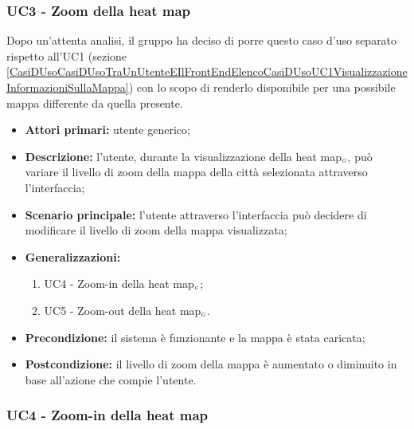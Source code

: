 \subsubsection{UC3 - Zoom della heat map}\label{CasiDUsoCasiDUsoTraUnUtenteEIlFrontEndElencoCasiDUsoUC3ZoomDellaHeatMap}

Dopo un'attenta analisi, il gruppo ha deciso di porre questo caso d'uso separato rispetto all'UC1 (sezione \ref{CasiDUsoCasiDUsoTraUnUtenteEIlFrontEndElencoCasiDUsoUC1VisualizzazioneInformazioniSullaMappa}) con lo scopo di renderlo disponibile per una possibile mappa differente da quella presente.



\begin{itemize}
	\item \textbf{Attori primari:} utente generico;
	\item \textbf{Descrizione:} l’utente, durante la visualizzazione della heat map$_{\scaleto{G}{3pt}}$, può variare il livello di zoom della mappa della città selezionata attraverso l'interfaccia;
	\item \textbf{Scenario principale:} l’utente attraverso l'interfaccia può decidere di modificare il livello di zoom della mappa visualizzata;
	\item \textbf{Generalizzazioni:}\begin{enumerate}
		\item UC4 - Zoom-in della heat map$_{\scaleto{G}{3pt}}$;
		\item UC5 - Zoom-out della heat map$_{\scaleto{G}{3pt}}$.
	\end{enumerate}
	\item \textbf{Precondizione:} il sistema è funzionante e la mappa è stata caricata;
	\item \textbf{Postcondizione:} il livello di zoom della mappa è aumentato o diminuito in base all'azione che compie l'utente.
\end{itemize}

\subsubsection{UC4 - Zoom-in della heat map}\label{CasiDUsoCasiDUsoTraUnUtenteEIlFrontEndElencoCasiDUsoUC31ZoomInDellaHeatMap}

